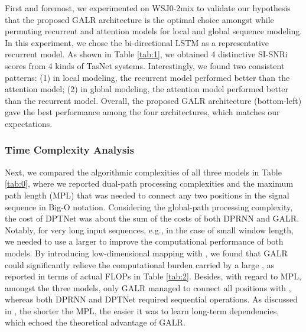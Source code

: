 \documentclass{article}
\begin{document}
First and foremost, we experimented on WSJ0-2mix to validate our hypothesis that the proposed GALR architecture is the optimal choice amongst while permuting recurrent and attention models for local and global sequence modeling.
In this experiment, we chose the bi-directional LSTM as a representative recurrent model. As shown in Table \ref{tab:1}, we obtained 4 distinctive SI-SNRi scores from 4 kinds of TasNet systems. Interestingly, we found two consistent patterns: (1) in local modeling, the recurrent model performed better than the attention model; (2) in global modeling, the attention model performed better than the recurrent model. Overall, the proposed GALR architecture (bottom-left) gave the best performance among the four architectures, which matches our expectations.

\subsubsection{Time Complexity Analysis}
Next, we compared the algorithmic complexities of all three models in Table \ref{tab:0}, where we reported dual-path processing complexities and the maximum path length (MPL) \cite{vaswani2017attention} that was needed to connect any two positions in the signal sequence in Big-O notation. Considering the global-path processing complexity, the cost of DPTNet was about the sum of the costs of both DPRNN and GALR. Notably, for very long input sequences, e.g., in the case of small window length, we needed to use a larger  to improve the computational performance of both models. By introducing low-dimensional mapping with , we found that GALR could significantly relieve the computational burden carried by a large , as reported in terms of actual FLOPs in Table \ref{tab:2}. Besides, with regard to MPL, amongst the three models, only GALR managed to connect all positions with , whereas both DPRNN and DPTNet required  sequential operations. As discussed in \cite{hochreiter2001gradient}, the shorter the MPL, the easier it was to learn long-term dependencies, which echoed the theoretical advantage of GALR.
\end{document}
